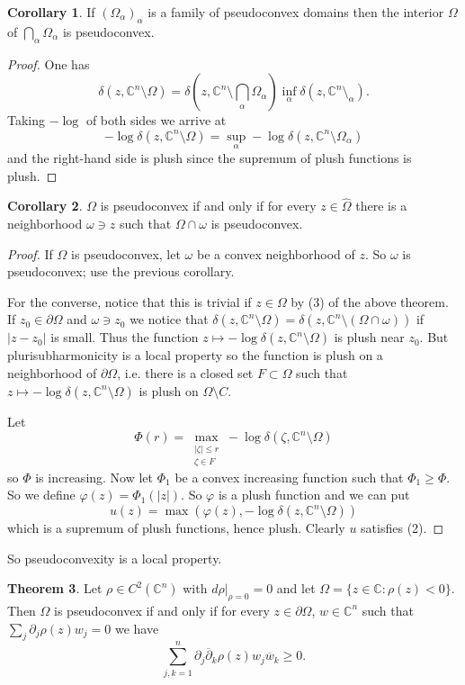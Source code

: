 \documentclass[12pt]{report}
\newcommand{\CC}{\mathbb{C}}
\newcommand{\dbar}{\overline\partial}
\theoremstyle{definition}
\newtheorem{theorem}{Theorem}[chapter]
\newtheorem{corollary}[theorem]{Corollary}
\begin{document}
\begin{corollary}
    If $(\Omega_\alpha)_\alpha$ is a family of pseudoconvex domains then the interior $\Omega$ of $\bigcap_\alpha \Omega_\alpha$ is pseudoconvex.
\end{corollary}
\begin{proof}
    One has
    $$\delta(z, \CC^n \setminus \Omega) = \delta\left(z, \CC^n \setminus \bigcap_\alpha \Omega_\alpha\right) \inf_\alpha \delta(z, \CC^n \setminus_\alpha).$$
    Taking $-\log$ of both sides we arrive at
    $$-\log \delta(z, \CC^n \setminus \Omega) = \sup_\alpha -\log \delta(z, \CC^n \setminus \Omega_\alpha)$$
    and the right-hand side is plush since the supremum of plush functions is plush.
\end{proof}
\begin{corollary}
    $\Omega$ is pseudoconvex if and only if for every $z \in \hat \Omega$ there is a neighborhood $\omega \ni z$ such that $\Omega \cap \omega$ is pseudoconvex.
\end{corollary}
\begin{proof}
    If $\Omega$ is pseudoconvex, let $\omega$ be a convex neighborhood of $z$. So $\omega$ is pseudoconvex; use the previous corollary.

    For the converse, notice that this is trivial if $z \in \Omega$ by (3) of the above theorem. If $z_0 \in \partial \Omega$ and $\omega \ni z_0$ we notice that $\delta(z, \CC^n \setminus \Omega) = \delta(z, \CC^n \setminus (\Omega \cap \omega))$ if $|z - z_0|$ is small. Thus the function $z \mapsto -\log \delta(z, \CC^n \setminus \Omega)$ is plush near $z_0$. But plurisubharmonicity is a local property so the function is plush on a neighborhood of $\partial \Omega$, i.e. there is a closed set $F \subset \Omega$ such that $z \mapsto -\log \delta(z, \CC^n \setminus \Omega)$ is plush on $\Omega \setminus C$.

    Let
    $$\Phi(r) = \max_{\substack{|\zeta| \leq r\\\zeta \in F}} -\log \delta(\zeta, \CC^n \setminus \Omega)$$
    so $\Phi$ is increasing. Now let $\Phi_1$ be a convex increasing function such that $\Phi_1 \geq \Phi$. So we define $\varphi(z) = \Phi_1(|z|)$. So $\varphi$ is a plush function and we can put
    $$u(z) = \max(\varphi(z), -\log\delta(z, \CC^n\setminus\Omega))$$
    which is a supremum of plush functions, hence plush. Clearly $u$ satisfies (2).
\end{proof}
    So pseudoconvexity is a local property.
\begin{theorem}
    \label{Levi condition}
    Let $\rho \in C^2(\CC^n)$ with $d\rho|_{\rho = 0} = 0$ and let $\Omega = \{z \in \CC: \rho(z) < 0\}$. Then $\Omega$ is pseudoconvex if and only if for every $z \in \partial \Omega$, $w \in \CC^n$ such that $\sum_j \partial_j \rho(z) w_j = 0$
    we have
    $$\sum_{j,k=1}^n \partial_j \dbar_k \rho(z) w_j \overline w_k \geq 0.$$
\end{theorem}
\end{document}
